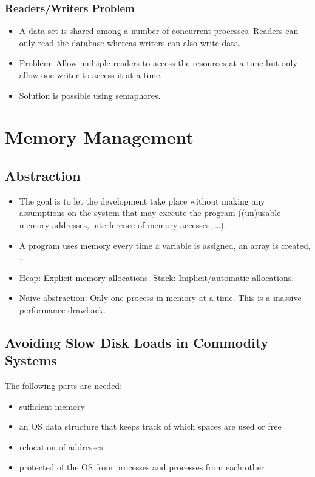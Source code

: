 
        \subsection{Readers/Writers Problem}
            \begin{itemize}
            	\item A data set is shared among a number of concurrent processes. Readers can only read the database whereas writers can also write data.
            	\item Problem: Allow multiple readers to access the resources at a time but only allow one writer to access it at a time.
            	\item Solution is possible using semaphores.
            \end{itemize}
        

\chapter{Memory Management}
    \section{Abstraction}
        \begin{itemize}
        	\item The goal is to let the development take place without making any assumptions on the system that may execute the program ((un)usable memory addresses, interference of memory accesses, \dots).
        	\item A program uses memory every time a variable is assigned, an array is created, \dots
        	\item Heap: Explicit memory allocations. Stack: Implicit/automatic allocations.
        	\item Naive abstraction: Only one process in memory at a time. This is a massive performance drawback.
        \end{itemize}

    \section{Avoiding Slow Disk Loads in Commodity Systems}
        The following parts are needed:
        \begin{itemize}
        	\item sufficient memory
        	\item an OS data structure that keeps track of which spaces are used or free
        	\item relocation of addresses
        	\item protected of the OS from processes and processes from each other
        \end{itemize}

